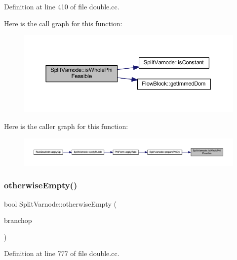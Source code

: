 Definition at line 410 of file double.\+cc.

Here is the call graph for this function\+:
\nopagebreak
\begin{figure}[H]
\begin{center}
\leavevmode
\includegraphics[width=350pt]{class_split_varnode_a0f6bba38e4adb554ebb69658cf3e3ee7_cgraph}
\end{center}
\end{figure}
Here is the caller graph for this function\+:
\nopagebreak
\begin{figure}[H]
\begin{center}
\leavevmode
\includegraphics[width=350pt]{class_split_varnode_a0f6bba38e4adb554ebb69658cf3e3ee7_icgraph}
\end{center}
\end{figure}
\mbox{\label{class_split_varnode_a9f91b0588de935c3f07a1cb7e59949a5}} 
\subsubsection{\texorpdfstring{otherwiseEmpty()}{otherwiseEmpty()}}
{\footnotesize\ttfamily bool Split\+Varnode\+::otherwise\+Empty (\begin{DoxyParamCaption}\item[{\mbox{\hyperlink{class_pcode_op}{Pcode\+Op}} $\ast$}]{branchop }\end{DoxyParamCaption})\hspace{0.3cm}{\ttfamily [static]}}



Definition at line 777 of file double.\+cc.

